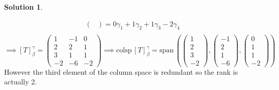 \documentclass[10pt]{article}
\theoremstyle{definition}
\newtheorem{soln}{Solution}
\begin{document}
\begin{soln}
\begin{enumerate}[label=(\alph*)]
\begin{align*}
\begin{pmatrix}
                          \end{pmatrix}=0\gamma_1+1\gamma_2+1\gamma_3-2\gamma_4  \\
          \end{align*}
          $\implies\left[T\right]_\beta^\gamma=\begin{pmatrix}
              1  & -1 & 0  \\
              2  & 2  & 1  \\
              3  & 1  & 1  \\
              -2 & -6 & -2
            \end{pmatrix}\implies\text{colsp}\,\left[T\right]_\beta^\gamma=\text{span}\,\left(
            \begin{pmatrix}
                1 \\
                2 \\
                3 \\
                -2
              \end{pmatrix},
            \begin{pmatrix}
                -1 \\
                2  \\
                1  \\
                -6
              \end{pmatrix},
            \begin{pmatrix}
                0 \\
                1 \\
                1 \\
                -2
              \end{pmatrix}\right)$ However the third element of the column space is redundant so the rank is actually 2.
  \end{enumerate}
\end{soln}
\end{document}
